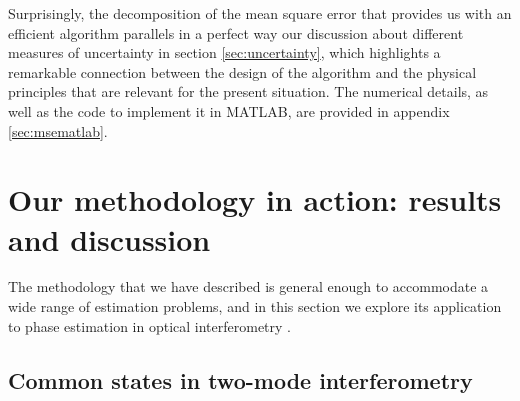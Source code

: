 Surprisingly, the decomposition of the mean square error that provides us with an efficient algorithm parallels in a perfect way our discussion about different measures of uncertainty in section \ref{sec:uncertainty}, which highlights a remarkable connection between the design of the algorithm and the physical principles that are relevant for the present situation. The numerical details, as well as the code to implement it in MATLAB, are provided in appendix \ref{sec:msematlab}. 

\section{Our methodology in action: results and discussion} 
\label{results}

The methodology that we have described is general enough to accommodate a wide range of estimation problems, and in this section we explore its application to phase estimation in optical interferometry \cite{rafal2015, yurke1986}. 

\subsection{Common states in two-mode interferometry}
\label{subsec:commoninter}

